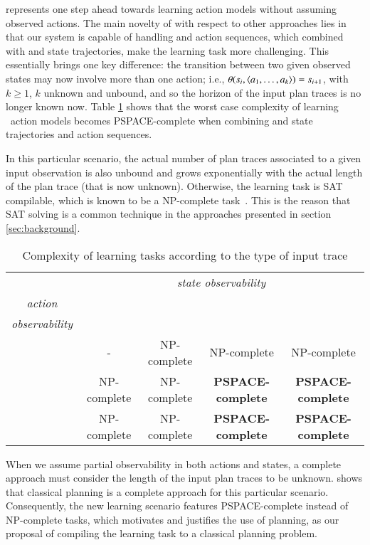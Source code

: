 \FAMA represents one step ahead towards learning action models without assuming observed actions. The main novelty of \FAMA with respect to other approaches lies in that our system is capable of handling \PO and \NO action sequences, which combined with \PO and \NO state trajectories, make the learning task more challenging. This essentially brings one key difference: the transition between two given observed states may now involve more than one action; i.e., $\theta(s_i,{\langle a_1,\ldots,a_k \rangle})=s_{i+1}$, with $k \geq 1$, $k$ unknown and unbound, and so the horizon of the input plan traces is no longer known now. Table \ref{tab:complex} shows that the worst case complexity of learning \strips\ action models becomes PSPACE-complete when combining \PO and \NO state trajectories and action sequences.

In this particular scenario, the actual number of plan traces associated to a given input observation is also unbound and grows exponentially with the actual length of the plan trace (that is now unknown). Otherwise, the learning task is SAT compilable, which is known to be a NP-complete task~\cite{russell2016artificial}. This is the reason that SAT solving is a common technique in the approaches presented in section \ref{sec:background}.


\begin{table}[ht]
\centering
\begin{tabular}{c|c|c|c|c|}
	& \multicolumn{4}{c|}{\emph{state observability}} \\ \cline{2-5}
	\multirow{1}{*}{\emph{action}} & \FO & \POstar & \PO & \NO\\ {\emph{observability}} & & & & \\ \hline
	\FO & - & NP-complete & NP-complete & NP-complete \\ \hline
	\PO & NP-complete & NP-complete & \textbf{PSPACE-complete} & \textbf{PSPACE-complete} \\ \hline
	\NO & NP-complete & NP-complete & \textbf{PSPACE-complete} & \textbf{PSPACE-complete} \\ \hline
\end{tabular}
\caption{Complexity of learning tasks according to the type of input trace}
\label{tab:complex}
\end{table}


When we assume partial observability in both actions and states, a complete approach must consider the length of the input plan traces to be unknown. \FAMA shows that classical planning is a complete approach for this particular scenario. Consequently, the new learning scenario features PSPACE-complete instead of NP-complete tasks, which motivates and justifies the use of planning, as our proposal of compiling the learning task to a classical planning problem.

